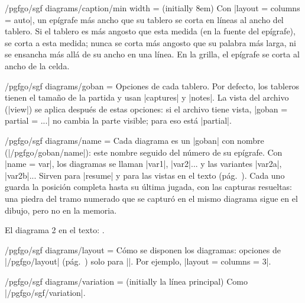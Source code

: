 \begin{key}{/pgfgo/sgf diagrams/caption/min width =  (initially 8em)}
	Con |layout = {columns = auto}|, un epígrafe más ancho que su tablero se corta en líneas al ancho del tablero. Si el tablero es más angosto que esta medida (en la fuente del epígrafe), se corta a esta medida; nunca se corta más angosto que su palabra más larga, ni se ensancha más allá de su ancho en una línea. En la grilla, el epígrafe se corta al ancho de la celda.
\end{key}

\begin{key}{/pgfgo/sgf diagrams/goban = }
	Opciones de cada tablero. Por defecto, los tableros tienen el tamaño de la partida y usan |captures| y |notes|. La vista del archivo (|view|) se aplica después de estas opciones: si el archivo tiene vista, |goban = {partial = ...}| no cambia la parte visible; para eso está |partial|.
\end{key}

\begin{key}{/pgfgo/sgf diagrams/name = }
	Cada diagrama es un |goban| con nombre (|/pgfgo/goban/name|): este nombre seguido del número de su epígrafe. Con |name = var|, los diagramas se llaman |var1|, |var2|... y las variantes |var2a|, |var2b|... Sirven para |resume| y para las vistas en el texto (pág.~\pageref{subsec:vistas}). Cada uno guarda la posición completa hasta su última jugada, con las capturas resueltas: una piedra del tramo numerado que se capturó en el mismo diagrama sigue en el dibujo, pero no en la memoria.

	\begin{codeexample}[]

		El diagrama 2 en el texto: .
	\end{codeexample}
\end{key}

\begin{key}{/pgfgo/sgf diagrams/layout = }
	Cómo se disponen los diagramas: opciones de |/pgfgo/layout| (pág.~\pageref{subsec:disposicion}) solo para |\sgfdiagrams|. Por ejemplo, |layout = {columns = 3}|.
\end{key}

\begin{key}{/pgfgo/sgf diagrams/variation =  (initially la línea principal)}
	Como |/pgfgo/sgf/variation|.
\end{key}

